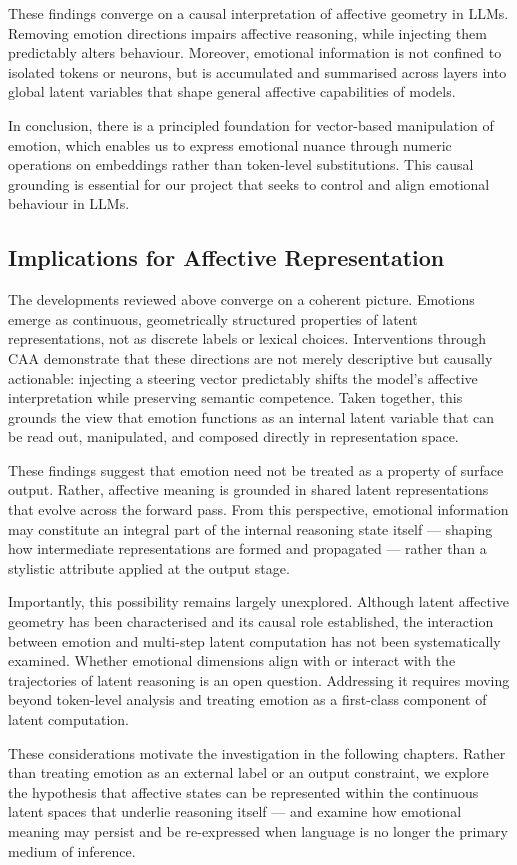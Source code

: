 These findings converge on a causal interpretation of affective geometry in LLMs. Removing emotion directions impairs affective reasoning, while injecting them predictably alters behaviour. Moreover, emotional information is not confined to isolated tokens or neurons, but is accumulated and summarised across layers into global latent variables that shape general affective capabilities of models.

In conclusion, there is a principled foundation for vector-based manipulation of emotion, which enables us to express emotional nuance through numeric operations on embeddings rather than token-level substitutions. This causal grounding is essential for our project that seeks to control and align emotional behaviour in LLMs.

\subsection{Implications for Affective Representation}

The developments reviewed above converge on a coherent picture. Emotions emerge as continuous, geometrically structured properties of latent representations, not as discrete labels or lexical choices. Interventions through CAA demonstrate that these directions are not merely descriptive but causally actionable: injecting a steering vector predictably shifts the model's affective interpretation while preserving semantic competence. Taken together, this grounds the view that emotion functions as an internal latent variable that can be read out, manipulated, and composed directly in representation space.

These findings suggest that emotion need not be treated as a property of surface output. Rather, affective meaning is grounded in shared latent representations that evolve across the forward pass. From this perspective, emotional information may constitute an integral part of the internal reasoning state itself — shaping how intermediate representations are formed and propagated — rather than a stylistic attribute applied at the output stage.

Importantly, this possibility remains largely unexplored. Although latent affective geometry has been characterised and its causal role established, the interaction between emotion and multi-step latent computation has not been systematically examined. Whether emotional dimensions align with or interact with the trajectories of latent reasoning is an open question. Addressing it requires moving beyond token-level analysis and treating emotion as a first-class component of latent computation.

These considerations motivate the investigation in the following chapters. Rather than treating emotion as an external label or an output constraint, we explore the hypothesis that affective states can be represented within the continuous latent spaces that underlie reasoning itself — and examine how emotional meaning may persist and be re-expressed when language is no longer the primary medium of inference.

